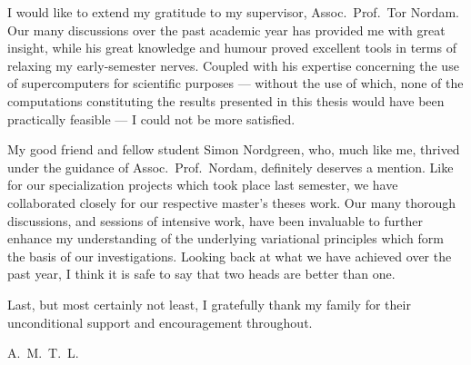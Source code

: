 I would like to extend my gratitude to my supervisor, Assoc.\ Prof.\ Tor
Nordam. Our many discussions over the past academic year has provided me with
great insight, while his great knowledge and humour proved excellent tools in
terms of relaxing my early-semester nerves. Coupled with his expertise
concerning the use of supercomputers for scientific purposes --- without the
use of which, none of the computations constituting the results presented in
this thesis would have been practically feasible --- I could not be more
satisfied.

My good friend and fellow student Simon Nordgreen, who, much like me, thrived
under the guidance of Assoc.\ Prof.\ Nordam, definitely deserves a mention. Like
for our specialization projects which took place last semester, we have
collaborated closely for our respective master's theses work. Our many thorough
discussions, and sessions of intensive work, have been invaluable to further
enhance my understanding of the underlying variational principles which form
the basis of our investigations. Looking back at what we have achieved over the
past year, I think it is safe to say that two heads are better than one.


Last, but most certainly not least, I gratefully thank my family for their
unconditional support and encouragement throughout.

\begin{minipage}[t]{\textwidth}
\begin{flushright}
A.\ M.\ T.\ L.
\end{flushright}
\end{minipage}
